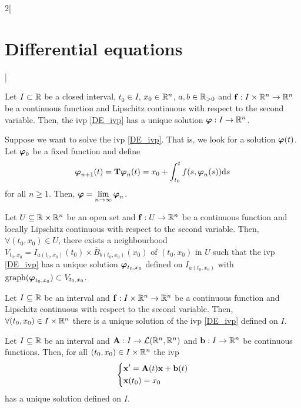 \documentclass[../../../main.tex]{subfiles}
\begin{document}
\begin{multicols}{2}[\section{Differential equations}]
\begin{theorem}
  \end{theorem}
  \begin{prop}
    Let $I\subset \mathbb{R}$ be a closed interval, $t_0\in I$, $x_0\in\mathbb{R}^n$, $a,b\in\mathbb{R}_{>0}$ and $\boldsymbol{\mathrm{f}}:I\times\mathbb{R}^n\rightarrow\mathbb{R}^n$ be a continuous function and Lipschitz continuous with respect to the second variable. Then, the ivp \eqref{DE_ivp} has a unique solution $\boldsymbol{\mathrm{\varphi}}:I\rightarrow\mathbb{R}^n$.
  \end{prop}
  \begin{corollary}
    Suppose we want to solve the ivp \eqref{DE_ivp}. That is, we look for a solution $\boldsymbol{\mathrm{\varphi}}(t)$. Let $\boldsymbol{\mathrm{\varphi}}_0$ be a fixed function and define
    $$\boldsymbol{\mathrm{\varphi}}_{n+1}(t)=\boldsymbol{\mathrm{T}}\boldsymbol{\mathrm{\varphi}}_n(t)=x_0+\int_{t_0}^tf(s,\boldsymbol{\mathrm{\varphi}}_n(s))\dd s$$
    for all $n\geq 1$. Then, $\displaystyle\boldsymbol{\mathrm{\varphi}}=\lim_{n\to\infty}\boldsymbol{\mathrm{\varphi}}_n$.
  \end{corollary}
  \begin{corollary}
    Let $U\subseteq\mathbb{R}\times\mathbb{R}^n$ be an open set and $\boldsymbol{\mathrm{f}}:U\rightarrow\mathbb{R}^n$ be a continuous function and locally Lipschitz continuous with respect to the second variable. Then, $\forall(t_0,x_0)\in U$, there exists a neighbourhood $V_{t_0,x_0}=I_{a(t_0,x_0)}(t_0)\times\overline{B}_{b(t_0,x_0)}(x_0)$ of $(t_0,x_0)$ in $U$ such that the ivp \eqref{DE_ivp} has a unique solution $\boldsymbol{\mathrm{\varphi}}_{t_0,x_0}$ defined on $I_{a(t_0,x_0)}$ with $\operatorname{graph}(\boldsymbol{\mathrm{\varphi}}_{t_0,x_0})\subset V_{t_0,x_0}$.
  \end{corollary}
  \begin{prop}
    Let $I\subseteq\mathbb{R}$ be an interval and $\boldsymbol{\mathrm{f}}:I\times\mathbb{R}^n\rightarrow\mathbb{R}^n$ be a continuous function and Lipschitz continuous with respect to the second variable. Then, $\forall(t_0,x_0)\in I\times\mathbb{R}^n$ there is a unique solution of the ivp \eqref{DE_ivp} defined on $I$.
  \end{prop}
  \begin{corollary}
    Let $I\subseteq\mathbb{R}$ be an interval and $\boldsymbol{\mathrm{A}}:I\rightarrow\mathcal{L}(\mathbb{R}^n,\mathbb{R}^n)$ and $\boldsymbol{\mathrm{b}}:I\rightarrow\mathbb{R}^n$ be continuous functions. Then, for all $(t_0,x_0)\in I\times\mathbb{R}^n$ the ivp
    $$
      \left\{
      \begin{aligned}
         & \boldsymbol{\mathrm{x}}'=\boldsymbol{\mathrm{A}}(t)\boldsymbol{\mathrm{x}}+\boldsymbol{\mathrm{b}}(t) \\
         & \boldsymbol{\mathrm{x}}(t_0)=x_0
      \end{aligned}
      \right.
    $$
    has a unique solution defined on $I$.
  \end{corollary}

\end{multicols}
\end{document}
